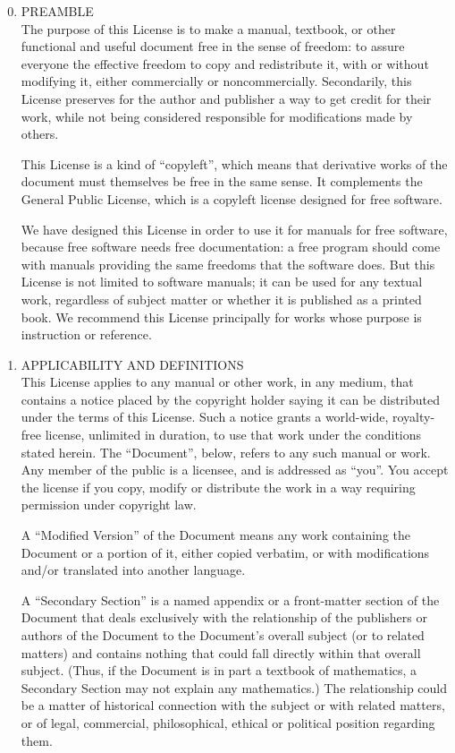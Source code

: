 \begin{enumerate}
  \setcounter{enumi}{-1}%
\item
  PREAMBLE \\
  The purpose of this License is to make a manual, textbook, or other functional and useful
  document free in the sense of freedom: to assure everyone the effective freedom to copy and
  redistribute it, with or without modifying it, either commercially or noncommercially.
  Secondarily, this License preserves for the author and publisher a way to get credit for their
  work, while not being considered responsible for modifications made by others.

  This License is a kind of ``copyleft'', which means that derivative works of the document must
  themselves be free in the same sense.  It complements the  General Public
  License, which is a copyleft license designed for free software.

  We have designed this License in order to use it for manuals for free software, because free
  software needs free documentation: a free program should come with manuals providing the same
  freedoms that the software does.  But this License is not limited to software manuals; it can
  be used for any textual work, regardless of subject matter or whether it is published as a
  printed book.  We recommend this License principally for works whose purpose is instruction or
  reference.

\item
  APPLICABILITY AND DEFINITIONS \\
  This License applies to any manual or other work, in any medium, that contains a notice placed
  by the copyright holder saying it can be distributed under the terms of this License.  Such a
  notice grants a world-wide, royalty-free license, unlimited in duration, to use that work
  under the conditions stated herein.  The ``Document'', below, refers to any such manual or
  work.  Any member of the public is a licensee, and is addressed as ``you''.  You accept the
  license if you copy, modify or distribute the work in a way requiring permission under
  copyright law.

  A ``Modified Version'' of the Document means any work containing the Document or a portion of
  it, either copied verbatim, or with modifications and/or translated into another language.

  A ``Secondary Section'' is a named appendix or a front-matter section of the Document that
  deals exclusively with the relationship of the publishers or authors of the Document to the
  Document's overall subject (or to related matters) and contains nothing that could fall
  directly within that overall subject.  (Thus, if the Document is in part a textbook of
  mathematics, a Secondary Section may not explain any mathematics.)  The relationship could be
  a matter of historical connection with the subject or with related matters, or of legal,
  commercial, philosophical, ethical or political position regarding them.


\end{enumerate}
